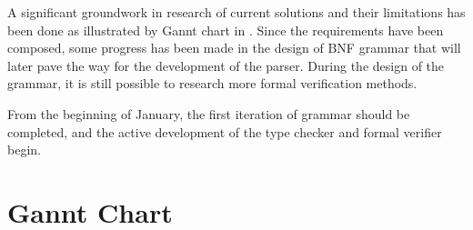 \documentclass[oneside]{ecsproject}     %
\begin{document}
A significant groundwork in research of current solutions and their limitations has been done as illustrated by Gannt chart in .
Since the requirements have been composed, some progress has been made in the design of BNF grammar that will later pave the way for the development
of the parser. During the design of the grammar, it is still possible to research more formal verification methods.

From the beginning of January, the first iteration of grammar should be completed, and the active development of the type checker and formal verifier begin.



\appendix

\chapter{Gannt Chart}
\end{document}
